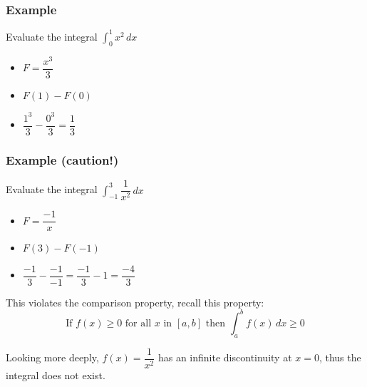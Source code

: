 \documentclass[t]{beamer}
\theoremstyle{plain}
\theoremstyle{definition}
\newcommand{\ds}{\displaystyle}
\begin{document}
\begin{frame}

\frametitle{Example}

Evaluate the integral $\ds\int_{0}^{1} x^2 \,dx$ \pause

\begin{itemize}
	\item $F = \dfrac{x^3}{3}$
	\item $F(1) - F(0)$
	\item $\dfrac{1^3}{3} - \dfrac{0^3}{3} = \dfrac{1}{3}$
\end{itemize}

\end{frame}
%
%
%
%
%
%
%
%
%
%
%
\begin{frame}

\frametitle{Example (caution!)}

Evaluate the integral $\ds\int_{-1}^{3} \dfrac{1}{x^2} \,dx$ \pause
 
 \begin{itemize}
	\item $F = \dfrac{-1}{x}$
	\item $F(3) - F(-1)$
	\item $\dfrac{-1}{3} - \dfrac{-1}{-1} = \dfrac{-1}{3} - 1 = \dfrac{-4}{3}$
\end{itemize}

\medskip

This violates the comparison property, recall this property:  $$\text{If } f(x)\geq0 \text{ for all } x \text{ in } [a,b] \text{ then } \int_a^b f(x)\,dx\geq0$$

Looking more deeply, $f(x) = \dfrac{1}{x^2}$ has an infinite discontinuity at $x = 0$, thus the integral does not exist.

\end{frame}
\end{document}
